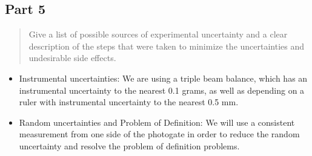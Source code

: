 \documentclass[10pt]{extarticle}
\begin{document}
{\subsection*{Part 5}
\begin{quote}
	Give a list of possible sources of experimental uncertainty and a clear description of the steps that were taken to minimize the uncertainties and undesirable side effects.
\end{quote}
\begin{itemize}
	\item Instrumental uncertainties: We are using a triple beam balance, which has an instrumental uncertainty to the nearest 0.1 grams, as well as depending on a ruler with instrumental uncertainty to the nearest 0.5 mm.
	\item Random uncertainties and Problem of Definition: We will use a consistent measurement from one side of the photogate in order to reduce the random uncertainty and resolve the problem of definition problems.
\end{itemize}
}
\end{document}
